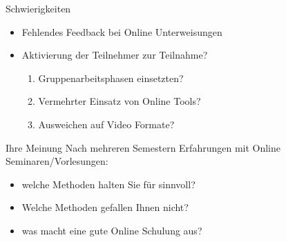 \documentclass[
  10pt,
  ignorenonframetext,
]{beamer}
\providecommand{\tightlist}{%
  \setlength{\itemsep}{0pt}\setlength{\parskip}{0pt}}
\begin{document}
\begin{frame}{Schwierigkeiten}
\protect\hypertarget{schwierigkeiten-1}{}
\begin{itemize}
\tightlist
\item
  Fehlendes Feedback bei Online Unterweisungen
\item
  Aktivierung der Teilnehmer zur Teilnahme?

  \begin{enumerate}
  \tightlist
  \item
    Gruppenarbeitsphasen einsetzten?
  \item
    Vermehrter Einsatz von Online Tools?
  \item
    Ausweichen auf Video Formate?
  \end{enumerate}
\end{itemize}
\end{frame}

\begin{frame}{Ihre Meinung}
\protect\hypertarget{ihre-meinung}{}
Nach mehreren Semestern Erfahrungen mit Online Seminaren/Vorlesungen:

\begin{itemize}
\tightlist
\item
  welche Methoden halten Sie für sinnvoll?
\item
  Welche Methoden gefallen Ihnen nicht?
\item
  was macht eine gute Online Schulung aus?
\end{itemize}
\end{frame}
\end{document}
